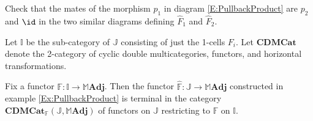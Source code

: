 \begin{exercise}
Check that the mates of the morphism $p_1$ in diagram \ref{E:PullbackProduct} are $p_2$ and $\id$ in the two similar diagrams defining $\hat{F}_1$ and $\hat{F}_2$.
\end{exercise}

Let $\mathbb{I}$ be the sub-category of $\mathbb{J}$ consisting of just the 1-cells $F_i$. Let $\mathbf{CDMCat}$ denote the 2-category of cyclic double multicategories, functors, and horizontal transformations.

\begin{theorem}
Fix a functor $\mathbb{F}\colon\mathbb{I}\to\mathbb{M}\mathbf{Adj}$. Then the functor $\hat{\mathbb{F}}\colon\mathbb{J}\to\mathbb{M}\mathbf{Adj}$ constructed in example \ref{Ex:PullbackProduct} is terminal in the category $\mathbf{CDMCat}_{\mathbb{F}}(\mathbb{J},\mathbb{M}\mathbf{Adj})$ of functors on $\mathbb{J}$ restricting to $\mathbb{F}$ on $\mathbb{I}$.
\end{theorem}
